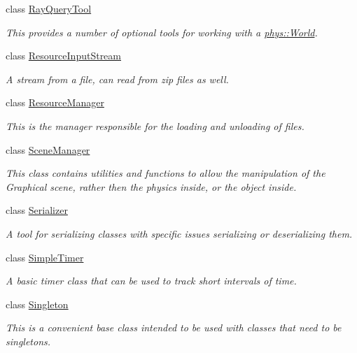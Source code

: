 \begin{DoxyCompactItemize}
class \hyperlink{classphys_1_1RayQueryTool}{RayQueryTool}
\begin{DoxyCompactList}\small\item\em This provides a number of optional tools for working with a \hyperlink{classphys_1_1World}{phys::World}. \item\end{DoxyCompactList}\item 
class \hyperlink{classphys_1_1ResourceInputStream}{ResourceInputStream}
\begin{DoxyCompactList}\small\item\em A stream from a file, can read from zip files as well. \item\end{DoxyCompactList}\item 
class \hyperlink{classphys_1_1ResourceManager}{ResourceManager}
\begin{DoxyCompactList}\small\item\em This is the manager responsible for the loading and unloading of files. \item\end{DoxyCompactList}\item 
class \hyperlink{classphys_1_1SceneManager}{SceneManager}
\begin{DoxyCompactList}\small\item\em This class contains utilities and functions to allow the manipulation of the Graphical scene, rather then the physics inside, or the object inside. \item\end{DoxyCompactList}\item 
class \hyperlink{classphys_1_1Serializer}{Serializer}
\begin{DoxyCompactList}\small\item\em A tool for serializing classes with specific issues serializing or deserializing them. \item\end{DoxyCompactList}\item 
class \hyperlink{classphys_1_1SimpleTimer}{SimpleTimer}
\begin{DoxyCompactList}\small\item\em A basic timer class that can be used to track short intervals of time. \item\end{DoxyCompactList}\item 
class \hyperlink{classphys_1_1Singleton}{Singleton}
\begin{DoxyCompactList}\small\item\em This is a convenient base class intended to be used with classes that need to be singletons. \item\end{DoxyCompactList}\item 

\end{DoxyCompactItemize}
